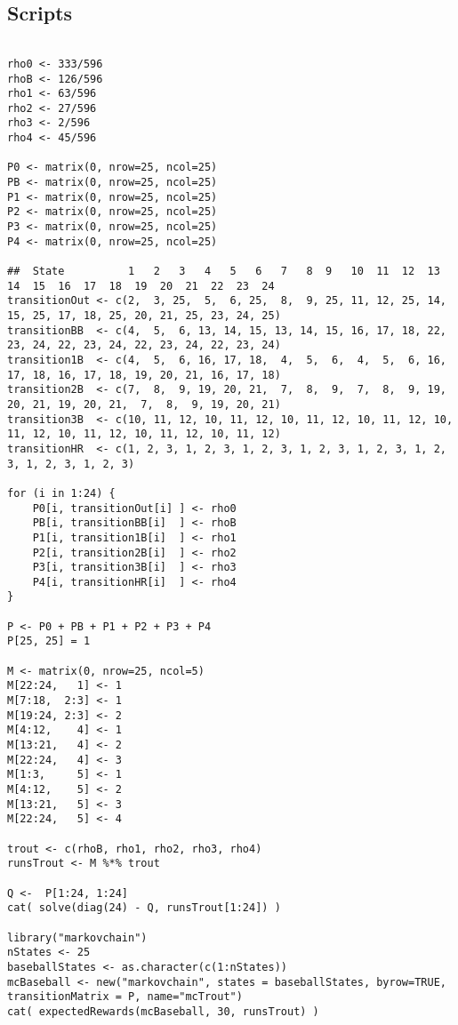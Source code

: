 \documentclass[12pt]{article}
\begin{document}
\subsection*{Scripts}

\begin{lstlisting}

rho0 <- 333/596
rhoB <- 126/596
rho1 <- 63/596
rho2 <- 27/596
rho3 <- 2/596
rho4 <- 45/596

P0 <- matrix(0, nrow=25, ncol=25)
PB <- matrix(0, nrow=25, ncol=25)
P1 <- matrix(0, nrow=25, ncol=25)
P2 <- matrix(0, nrow=25, ncol=25)
P3 <- matrix(0, nrow=25, ncol=25)
P4 <- matrix(0, nrow=25, ncol=25)

##  State          1   2   3   4   5   6   7   8  9   10  11  12  13  14  15  16  17  18  19  20  21  22  23  24
transitionOut <- c(2,  3, 25,  5,  6, 25,  8,  9, 25, 11, 12, 25, 14, 15, 25, 17, 18, 25, 20, 21, 25, 23, 24, 25)
transitionBB  <- c(4,  5,  6, 13, 14, 15, 13, 14, 15, 16, 17, 18, 22, 23, 24, 22, 23, 24, 22, 23, 24, 22, 23, 24)
transition1B  <- c(4,  5,  6, 16, 17, 18,  4,  5,  6,  4,  5,  6, 16, 17, 18, 16, 17, 18, 19, 20, 21, 16, 17, 18)
transition2B  <- c(7,  8,  9, 19, 20, 21,  7,  8,  9,  7,  8,  9, 19, 20, 21, 19, 20, 21,  7,  8,  9, 19, 20, 21)
transition3B  <- c(10, 11, 12, 10, 11, 12, 10, 11, 12, 10, 11, 12, 10, 11, 12, 10, 11, 12, 10, 11, 12, 10, 11, 12)
transitionHR  <- c(1, 2, 3, 1, 2, 3, 1, 2, 3, 1, 2, 3, 1, 2, 3, 1, 2, 3, 1, 2, 3, 1, 2, 3)

for (i in 1:24) {
    P0[i, transitionOut[i] ] <- rho0
    PB[i, transitionBB[i]  ] <- rhoB
    P1[i, transition1B[i]  ] <- rho1
    P2[i, transition2B[i]  ] <- rho2
    P3[i, transition3B[i]  ] <- rho3
    P4[i, transitionHR[i]  ] <- rho4
}

P <- P0 + PB + P1 + P2 + P3 + P4
P[25, 25] = 1

M <- matrix(0, nrow=25, ncol=5)
M[22:24,   1] <- 1
M[7:18,  2:3] <- 1
M[19:24, 2:3] <- 2
M[4:12,    4] <- 1
M[13:21,   4] <- 2
M[22:24,   4] <- 3
M[1:3,     5] <- 1
M[4:12,    5] <- 2
M[13:21,   5] <- 3
M[22:24,   5] <- 4

trout <- c(rhoB, rho1, rho2, rho3, rho4)
runsTrout <- M %*% trout

Q <-  P[1:24, 1:24]
cat( solve(diag(24) - Q, runsTrout[1:24]) )

library("markovchain")
nStates <- 25
baseballStates <- as.character(c(1:nStates))
mcBaseball <- new("markovchain", states = baseballStates, byrow=TRUE, transitionMatrix = P, name="mcTrout")
cat( expectedRewards(mcBaseball, 30, runsTrout) )
\end{lstlisting}
\end{document}
